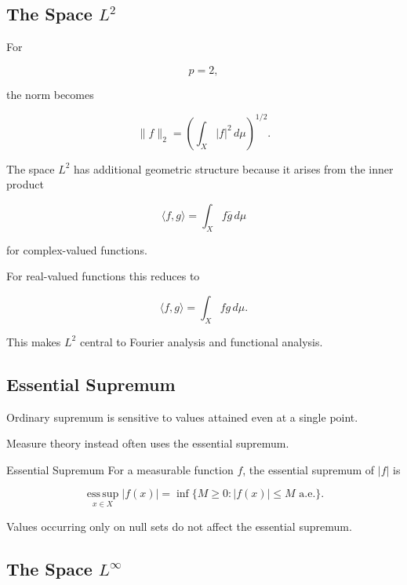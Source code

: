 \subsection{The Space \(L^2\)}
\label{subsec:l2-space}

For

\[
p=2,
\]

the norm becomes

\[
\boxed{
\|f\|_2
=
\left(
\int_X|f|^2\,d\mu
\right)^{1/2}.
}
\]

The space \(L^2\) has additional geometric structure because it arises
from the inner product

\[
\boxed{
\langle f,g\rangle
=
\int_X f\overline{g}\,d\mu
}
\]

for complex-valued functions.

For real-valued functions this reduces to

\[
\boxed{
\langle f,g\rangle
=
\int_Xfg\,d\mu.
}
\]

This makes \(L^2\) central to Fourier analysis and functional analysis.

\subsection{Essential Supremum}
\label{subsec:essential-supremum}

Ordinary supremum is sensitive to values attained even at a single point.

Measure theory instead often uses the essential supremum.

\begin{definitionbox}{Essential Supremum}
For a measurable function \(f\), the essential supremum of \(|f|\) is

\[
\boxed{
\operatorname*{ess\,sup}_{x\in X}|f(x)|
=
\inf
\{
M\geq0:
|f(x)|\leq M
\text{ a.e.}
\}.
}
\]
\end{definitionbox}

Values occurring only on null sets do not affect the essential supremum.

\subsection{The Space \(L^\infty\)}
\label{subsec:l-infinity}

